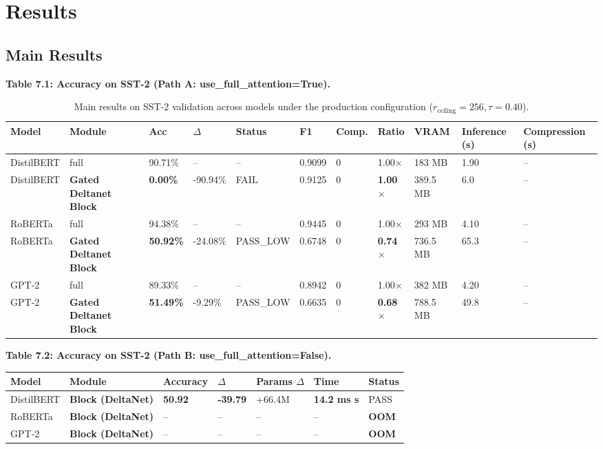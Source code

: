 
\section{Results}

\subsection{Main Results}

\textbf{Table 7.1: Accuracy on SST-2 (Path A: use\_full\_attention=True).}

\begin{table}[t]
\centering
\small
\begin{tabular}{lllllllllll}
\toprule
\textbf{Model} & \textbf{Module} & \textbf{Acc} & \textbf{$\Delta$} & \textbf{Status} & \textbf{F1} & \textbf{Comp.} & \textbf{Ratio} & \textbf{VRAM} & \textbf{Inference (s)} & \textbf{Compression (s)} \\
\midrule
DistilBERT & full & 90.71\% & -- & -- & 0.9099 & 0 & 1.00$\times$ & 183 MB & 1.90 & -- \\
DistilBERT & \textbf{Gated Deltanet Block} & \textbf{0.00\%} & -90.94\% & FAIL & 0.9125 & 0 & \textbf{1.00$\times$} & 389.5 MB & 6.0 & -- \\
RoBERTa & full & 94.38\% & -- & -- & 0.9445 & 0 & 1.00$\times$ & 293 MB & 4.10 & -- \\
RoBERTa & \textbf{Gated Deltanet Block} & \textbf{50.92\%} & -24.08\% & PASS_LOW & 0.6748 & 0 & \textbf{0.74$\times$} & 736.5 MB & 65.3 & -- \\
GPT-2 & full & 89.33\% & -- & -- & 0.8942 & 0 & 1.00$\times$ & 382 MB & 4.20 & -- \\
GPT-2 & \textbf{Gated Deltanet Block} & \textbf{51.49\%} & -9.29\% & PASS_LOW & 0.6635 & 0 & \textbf{0.68$\times$} & 788.5 MB & 49.8 & -- \\
\bottomrule
\end{tabular}
\caption{Main results on SST-2 validation across models under the production configuration ($r_{\mathrm{ceiling}}=256, \tau=0.40$).}
\label{tab:main_sst2}
\end{table}

\textbf{Table 7.2: Accuracy on SST-2 (Path B: use\_full\_attention=False).}

\begin{table}[H]
\centering
\small
\begin{tabular}{lllllll}
\toprule
\textbf{Model} & \textbf{Module} & \textbf{Accuracy} & \textbf{$\Delta$} & \textbf{Params $\Delta$} & \textbf{Time} & \textbf{Status} \\
\midrule
DistilBERT & \textbf{Block (DeltaNet)} & \textbf{50.92} & \textbf{-39.79} & +66.4M & \textbf{14.2 ms s} & PASS \\
RoBERTa & \textbf{Block (DeltaNet)} & -- & -- & -- & -- & \textbf{OOM} \\
GPT-2 & \textbf{Block (DeltaNet)} & -- & -- & -- & -- & \textbf{OOM} \\
\bottomrule
\end{tabular}
\end{table}

